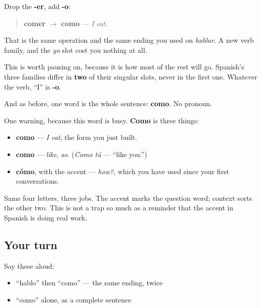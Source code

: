 \begin{grammarlens}[title={Grammar Lens: the ending that did not change}]
Drop the \textbf{-er}, add \textbf{-o}:

\begin{quote}
\textbf{comer} $\to$ \textbf{como} — \emph{I eat.}
\end{quote}

That is the same operation and the same ending you used on \emph{hablar}. A new verb family, and the \emph{yo} slot cost you nothing at all.

This is worth pausing on, because it is how most of the rest will go. Spanish's three families differ in \textbf{two} of their singular slots, never in the first one. Whatever the verb, \textquotedblleft{}I\textquotedblright{} is \textbf{-o}.

And as before, one word is the whole sentence: \textbf{como}. No pronoun.
\end{grammarlens}

\begin{cousinweb}
One warning, because this word is busy. \textbf{Como} is three things:

\begin{itemize}
\raggedright
  \item \textbf{como} — \emph{I eat}, the form you just built.
  \item \textbf{como} — \emph{like}, \emph{as}. (\emph{Como tú} — \textquotedblleft{}like you.\textquotedblright{})
  \item \textbf{cómo}, with the accent — \emph{how?}, which you have used since your first conversations.
\end{itemize}

Same four letters, three jobs. The accent marks the question word; context sorts the other two. This is not a trap so much as a reminder that the accent in Spanish is doing real work.
\end{cousinweb}

\subsection*{Your turn}
Say these aloud:

\begin{itemize}
\raggedright
  \item \textquotedblleft{}hablo\textquotedblright{} then \textquotedblleft{}como\textquotedblright{} — the same ending, twice
  \item \textquotedblleft{}como\textquotedblright{} alone, as a complete sentence
\end{itemize}

